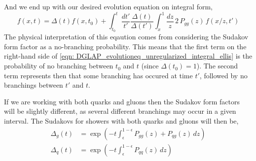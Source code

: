 \documentclass[main.tex]{subfiles}
\begin{document}
And we end up with our desired evolution equation on integral form, 
\begin{equation}\label{eqn: DGLAP_evolutioneq_unregularized_integral_ellis} %
    f(x,t) = \Delta(t) f(x,t_0) + \int_{t_0}^{t} \frac{dt'}{t'} \frac{\Delta(t)}{\Delta(t')} \int_{x}^{1} \frac{dz}{z} \,2\, P_{gg}(z) \, f(x/z, t')
\end{equation}
The physical interpretation of this eqaution comes from considering the Sudakov form factor as a no-branching probability. This means that the first term on the right-hand side of \autoref{eqn: DGLAP_evolutioneq_unregularized_integral_ellis} is the probability of no branching between \(t_0\) and \(t\) (since \(\Delta(t_0)=1\)). The second term represents then that some branching has occured at time \(t'\), followed by no branchings between \(t'\) and \(t\).

If we are working with both quarks and gluons then the Sudakov form factors will be slightly different, as several different branchings may occur in a given interval. The Sudakovs for showers with both quarks and gluons will then be, 
\begin{align}
    \Delta_{g}(t) &= \exp\left(-t \int_\epsilon^{1-\epsilon} P_{gg}(z)+P_{qg}(z) \, dz \right)  \label{eqn: sudakov_vacuum_gluons}  \\
    \Delta_{q}(t) &= \exp\left(-t \int_\epsilon^{1-\epsilon} P_{qq}(z) \, dz \right) \label{eqn: sudakov_vacuum_quarks}
\end{align}
\end{document}
